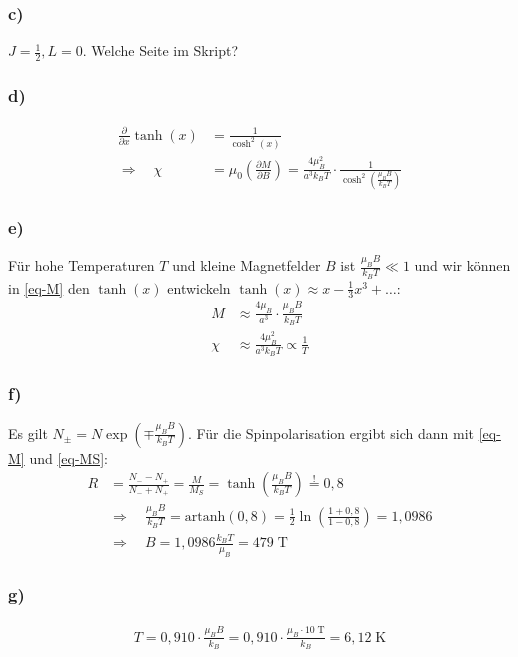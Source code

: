 \subsubsection*{c)}
$J = \frac{1}{2}, L = 0$. Welche Seite im Skript?

\subsubsection*{d)}
\begin{align*}
  \frac{\partial}{\partial x} \tanh(x) &= \frac{1}{\cosh^2 (x)} \\
  \Rightarrow \quad \chi &= \mu_0 \left(\frac{\partial M}{\partial B}\right) =
  \frac{4 \mu_B^2}{a^3 k_B T} \cdot \frac{1}{\cosh^2\left(\frac{\mu_B B}{k_B T}\right)}
\end{align*}

\subsubsection*{e)}
Für hohe Temperaturen $T$ und kleine Magnetfelder $B$ ist $\frac{\mu_B B}{k_B T} \ll 1$
und wir können in \eqref{eq-M} den $\tanh(x)$ entwickeln $\tanh(x) \approx x - \frac{1}{3}x^3 + \dots$:
\begin{align*}
  M &\approx \frac{4 \mu_B}{a^3} \cdot \frac{\mu_B B}{k_B T}\\
  \chi &\approx \frac{4 \mu_B^2}{a^3 k_B T} \propto \frac{1}{T}
\end{align*}

\subsubsection*{f)}
Es gilt $N_\pm = N \exp\left(\mp \frac{\mu_B B}{k_B T}\right)$.
Für die Spinpolarisation ergibt sich dann mit \eqref{eq-M} und \eqref{eq-MS}:
\begin{align*}
  R &=  \frac{N_- - N_+}{N_- + N_+} = \frac{M}{M_S} = \tanh \left(\frac{\mu_B B}{k_B T}\right) \overset{!} = 0{,}8 \\
  & \Rightarrow \quad \frac{\mu_B B}{k_B T} = \mathrm{artanh} (0{,}8) =
  \frac{1}{2} \ln \left(\frac{1 + 0{,}8}{1 - 0{,}8}\right) = 1{,}0986 \\
  & \Rightarrow \quad B = 1{,}0986 \frac{k_B T}{\mu_B} = 479\;\text{T}
\end{align*}

\subsubsection*{g)}
\begin{align*}
  T = 0{,}910 \cdot \frac{\mu_B B}{k_B} = 0{,}910 \cdot \frac{\mu_B \cdot 10\;\text{T} }{k_B}
  = 6{,}12\;\text{K}
\end{align*}
